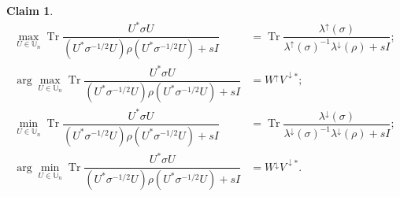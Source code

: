 \documentclass[10pt,reqno]{amsart}
\theoremstyle{break-italic}
\theoremstyle{break-italic}
\theoremstyle{break-italic}
\theoremstyle{break-italic}
\theoremstyle{break-italic}
\theoremstyle{break-italic}
\theoremstyle{break-italic}
\theoremstyle{break-italic}
\theoremstyle{break-roman}
\theoremstyle{standard}
\newtheorem{claim}[satz]{Claim}
\theoremstyle{varthm-roman}
\theoremstyle{varthm-italic}
\theoremstyle{varthm-roman-break}
\theoremstyle{varthm-italic-break}
\theoremstyle{varthm-roman-no-punctuation}
\theoremstyle{varthm-italic-no-punctuation}
\numberwithin{equation}{section}
\begin{document}
\begin{claim}\label{claimsigma}
\begin{align*}
\max_{U\in\mathbb U_n} \operatorname{Tr}\dfrac{U^*\sigma U}{(U^*\sigma^{-1/2}U)\rho(U^*\sigma^{-1/2}U)+sI}&=\operatorname{Tr} \dfrac{\lambda^\uparrow(\sigma)}{\lambda^\uparrow(\sigma)^{-1}\lambda^\downarrow(\rho)+sI};\\
\arg\max_{U\in \mathbb U_n}\operatorname{Tr}\dfrac{U^*\sigma U}{(U^*\sigma^{-1/2}U)\rho(U^*\sigma^{-1/2}U)+sI}&=W^\uparrow V^{\downarrow*};\\
\min_{U\in\mathbb U_n} \operatorname{Tr}\dfrac{U^*\sigma U}{(U^*\sigma^{-1/2}U)\rho(U^*\sigma^{-1/2}U)+sI}&= \operatorname{Tr} \dfrac{\lambda^\downarrow(\sigma)}{\lambda^\downarrow(\sigma)^{-1}\lambda^\downarrow(\rho)+sI};\\
\arg\min_{U\in \mathbb U_n} \operatorname{Tr}\dfrac{U^*\sigma U}{(U^*\sigma^{-1/2}U)\rho(U^*\sigma^{-1/2}U)+sI}&=W^\downarrow V^{\downarrow*}.
\end{align*}
\end{claim}
\end{document}
